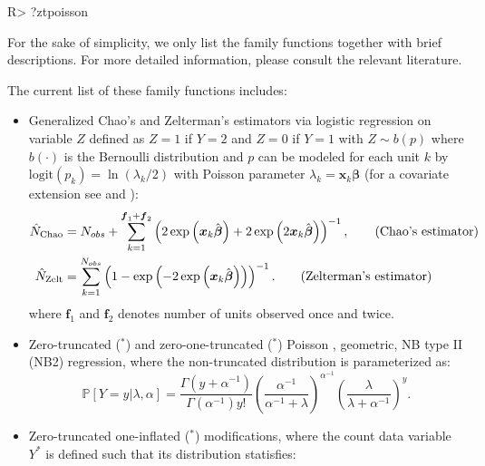\documentclass[
]{jss}
\newcommand{\1}{\mathcal{I}} \newcommand{\bZero}{\boldsymbol{0}}
\begin{document}
\begin{CodeChunk}
\begin{CodeInput}
R> ?ztpoisson
\end{CodeInput}
\end{CodeChunk}

For the sake of simplicity, we only list the family functions together
with brief descriptions. For more detailed information, please consult
the relevant literature.

The current list of these family functions includes:

\begin{itemize}
    \item Generalized Chao's \citep{chao1987estimating} and Zelterman's \citep{zelterman1988robust} estimators via logistic regression on variable $Z$ defined as $Z=1$ if $Y=2$ and $Z=0$ if $Y=1$ with $Z\sim b(p)$ where $b(\cdot)$ is the Bernoulli distribution and $p$ can be modeled for each unit $k$ by $\text{logit}(p_k)=\ln(\lambda_k/2)$ with Poisson parameter $\lambda_k=\boldsymbol{x}_{k}\boldsymbol{\beta}$ (for a covariate extension see \cite{chao-generalization} and \cite{zelterman}):
    \begin{align}
        \hat{N}_{\text{Chao}} &= N_{obs}+
        \sum_{k=1}^{\boldsymbol{f}_{1}+\boldsymbol{f}_{2}}
        \left(2\exp\left(\boldsymbol{x}_{k}\hat{\boldsymbol{\beta}}\right)+
        2\exp\left(2\boldsymbol{x}_{k}\hat{\boldsymbol{\beta}}\right)\right)^{-1},
        \tag{\text{Chao's estimator}}\\
        \hat{N}_{\text{Zelt}}&=\sum_{k=1}^{N_{obs}}
        \left(1-\exp\left(-2\exp\left(\boldsymbol{x}_{k}\hat{\boldsymbol{\beta}}\right)\right)\right)^{-1}.
        \tag{\text{Zelterman's estimator}}
    \end{align}
    where $\boldsymbol{f}_{1}$ and $\boldsymbol{f}_{2}$ denotes number of units observed once and twice.
    \item Zero-truncated ($^\ast$) and zero-one-truncated ($^\ast$) Poisson \citep[cf. ][]{zotmodels}, geometric, NB type II (NB2) regression, where the non-truncated distribution is parameterized as:
    \begin{equation*}
        \mathbb{P}[Y=y|\lambda,\alpha] = \frac{\Gamma\left(y+\alpha^{-1}\right)}{\Gamma\left(\alpha^{-1}\right)y!}
        \left(\frac{\alpha^{-1}}{\alpha^{-1}+\lambda}\right)^{\alpha^{-1}}
        \left(\frac{\lambda}{\lambda + \alpha^{-1}}\right)^{y}.
    \end{equation*}
    \item Zero-truncated one-inflated ($^\ast$) modifications, where the count data variable $Y^{\ast}$ is defined such that its distribution statisfies:

\end{itemize}
\end{document}
